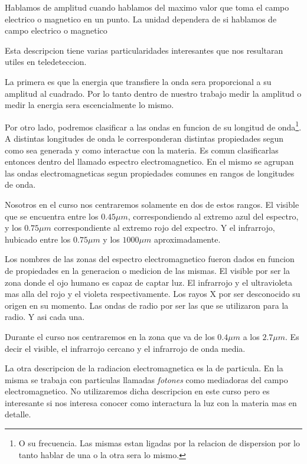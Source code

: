 \begin{dex}
  Hablamos de amplitud cuando hablamos del maximo valor que toma el campo
  electrico o magnetico en un punto. La unidad dependera de si hablamos de campo
  electrico o magnetico
\end{dex}

Esta descripcion tiene varias particularidades interesantes que nos resultaran
utiles en teledeteccion.

La primera es que la energia que transfiere la onda sera proporcional a su
amplitud al cuadrado. Por lo tanto dentro de nuestro trabajo medir la amplitud o
medir la energia sera escencialmente lo mismo.

Por otro lado, podremos clasificar a las ondas en funcion de su longitud de
onda\footnote{O su frecuencia. Las mismas estan ligadas por la relacion de
dispersion por lo tanto hablar de una o la otra sera lo mismo.}. A distintas
longitudes de onda le corresponderan distintas propiedades segun como sea
generada y como interactue con la materia. Es comun clasificarlas entonces
dentro del llamado espectro electromagnetico. En el mismo se agrupan las ondas
electromagneticas segun propiedades comunes en rangos de longitudes de onda.

Nosotros en el curso nos centraremos solamente en dos de estos rangos. El
visible que se encuentra entre los $0.45 \mu m$, correspondiendo al extremo azul
del espectro, y los $0.75 \mu m$ correspondiente al extremo rojo del expectro. Y
el infrarrojo, hubicado entre los $0.75 \mu m$ y los $1000 \mu m$
aproximadamente.

\begin{obs}
  Los nombres de las zonas del espectro electromagnetico fueron dados en funcion
  de propiedades en la generacion o medicion de las mismas. El visible por ser
  la zona donde el ojo humano es capaz de captar luz. El infrarrojo y el
  ultravioleta mas alla del rojo y el violeta respectivamente. Los rayos X por
  ser desconocido su origen en su momento. Las ondas de radio por ser las que se
  utilizaron para la radio. Y asi cada una.
\end{obs}

Durante el curso nos centraremos en la zona que va de los $0.4 \mu m$ a los $2.7
\mu m$. Es decir el visible, el infrarrojo cercano y el infrarrojo de onda
media.

\begin{obs}
  La otra descripcion de la radiacion electromagnetica es la de particula. En la
  misma se trabaja con particulas llamadas \emph{fotones} como mediadoras del
  campo electromagnetico. No utilizaremos dicha descripcion en este curso pero
  es interesante si nos interesa conocer como interactura la luz con la materia
  mas en detalle.
\end{obs}

